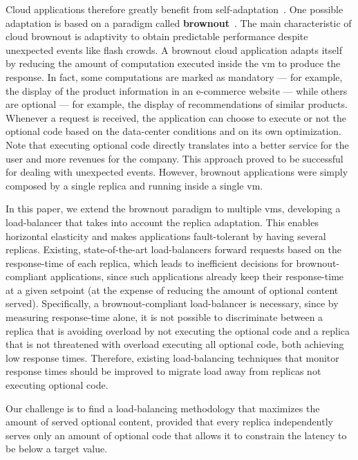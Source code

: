 Cloud applications therefore greatly benefit from
self-adaptation~\cite{SalehieSelfadaptive:TAAS}. One possible
adaptation is based on a paradigm called {\bf
  brownout}~\citep{cloudish-tr}. The main characteristic of cloud
brownout is adaptivity to obtain predictable performance despite
unexpected events like flash crowds. A brownout cloud application
adapts itself by reducing the amount of computation executed inside
the \ac{vm} to produce the response. In fact, some computations are
marked as mandatory --- for example, the display of the product
information in an e-commerce website --- while others are optional ---
for example, the display of recommendations of similar products.
Whenever a request is received, the application can choose to execute
or not the optional code based on the data-center conditions and on
its own optimization. Note that executing optional code directly
translates into a better service for the user and more revenues for
the company. This approach proved to be successful for dealing with
unexpected events. However, brownout applications were simply composed
by a single replica and running inside a single \ac{vm}.

In this paper, we extend the brownout paradigm to multiple \acp{vm},
developing a load-balancer that takes into account the replica
adaptation. This enables horizontal elasticity and makes applications
fault-tolerant by having several replicas. Existing, state-of-the-art
load-balancers forward requests based on the response-time of each
replica, which leads to inefficient decisions for brownout-compliant
applications, since such applications already keep their response-time
at a given setpoint (at the expense of reducing the amount of optional
content served). Specifically, a brownout-compliant load-balancer is
necessary, since by measuring response-time alone, it is not possible
to discriminate between a replica that is avoiding overload by not
executing the optional code and a replica that is not threatened with
overload executing all optional code, both achieving low response
times.  Therefore, existing load-balancing techniques that monitor
response times should be improved to migrate load away from replicas
not executing optional code.

Our challenge is to find a load-balancing methodology that maximizes
the amount of served optional content, provided that every replica
independently serves only an amount of optional code that allows it
to constrain the latency to be below a target value.


